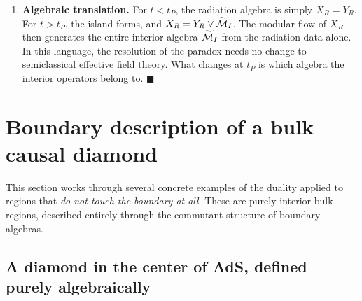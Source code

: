 \begin{keyresult}
\begin{enumerate}[leftmargin=*]
Setting the two branches equal gives the \textbf{Page time} $t_P$:
\[
\Gamma t_P = S_0 - \Gamma t_P \implies t_P = \frac{S_0}{2\Gamma} = \frac{1}{2} t_{\text{evap}} .
\]
Over the lifetime of the black hole, the resulting entropy is
\[
S(R) = \begin{cases}
\Gamma t & t < t_P \quad (\text{no island}), \\
S_0 - \Gamma t = \frac{A_{\text{BH}}(t)}{4G_N} & t > t_P \quad (\text{island } I).
\end{cases}
\]
The early phase, with no island, is the Hawking phase. The late phase, with the interior island $I$, is the
unitary phase.
At $t = t_{\text{evap}}$, $S(R) \to 0$ as the black hole disappears. This is the value unitary evolution
requires: the final radiation is in a pure state.

\item \textbf{Algebraic translation.}
For $t < t_P$, the radiation algebra is simply $X_R = Y_R$. For $t > t_P$, the island forms, and
$X_R = Y_R \vee \widetilde{\mathcal{M}}_I$. The modular flow of $X_R$ then generates the entire interior algebra
$\widetilde{\mathcal{M}}_I$ from the radiation data alone. In this language, the resolution of the paradox needs no change
to semiclassical effective field theory. What changes at $t_P$ is which algebra the interior operators belong
to. $\blacksquare$
\end{enumerate}
\end{keyresult}

\section{Boundary description of a bulk causal diamond}

This section works through several concrete examples of the duality applied to regions that \emph{do not
touch the boundary at all}. These are purely interior bulk regions, described entirely through the commutant
structure of boundary algebras.

\subsection*{A diamond in the center of AdS, defined purely algebraically}

